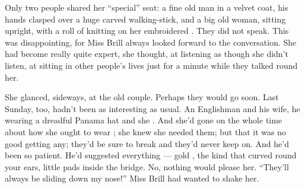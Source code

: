 \documentclass{fiche}
\begin{document}
\begin{texte}
Only two people shared her ``special'' seat: a fine old man in a velvet coat, his hands
clasped over a huge carved walking-stick, and a big old woman, sitting upright, with a roll of
knitting on her embroidered . They did not speak. This was
disappointing, for Miss Brill always looked forward to the conversation. She had become really
quite expert, she thought, at listening as though she didn't listen, at sitting in other
people's lives just for a minute while they talked round her.

She glanced, sideways, at the old couple. Perhaps they would go soon. Last Sunday, too, hadn't
been as interesting as usual. An Englishman and his wife, he wearing a dreadful Panama hat and
she . And she'd gone on the whole time
about how she ought to wear ; she knew she needed
them; but that it was no good getting any; they'd be sure to break and they'd never keep on.
And he'd been so patient. He'd suggested everything --- gold ,
the kind that curved round your ears, little pads inside the bridge. No, nothing would please
her. ``They'll always be sliding down my nose!'' Miss Brill had wanted to shake her.
\end{texte}

\end{document}
